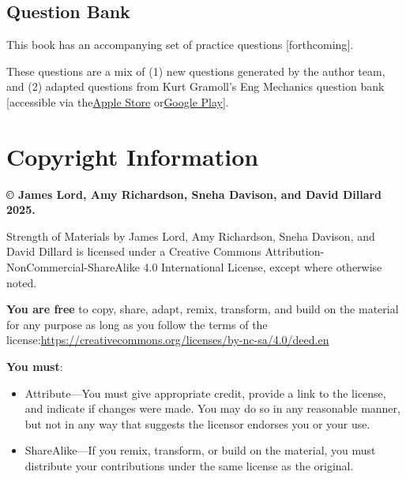 \documentclass[
  letterpaper,
  DIV=11,
  numbers=noendperiod]{scrreprt}
\theoremstyle{definition}
\theoremstyle{remark}
\begin{document}
\subsection*{\texorpdfstring{\textbf{Question
Bank}}{Question Bank}}\label{question-bank}

This book has an accompanying set of practice questions
{[}forthcoming{]}.

These questions are a mix of (1) new questions generated by the author
team, and (2) adapted questions from Kurt Gramoll's Eng Mechanics
question bank {[}accessible via
the\href{https://apps.apple.com/us/app/eng-mechanics/id1526030024}{Apple
Store}
or\href{https://play.google.com/store/apps/details?id=air.com.gramago.engProbME&pli=1}{Google
Play}{]}.

\section*{\texorpdfstring{\textbf{Copyright
Information}}{Copyright Information}}\label{copyright-information}


\textbf{© James Lord, Amy Richardson, Sneha Davison, and David Dillard
2025.}

Strength of Materials by James Lord, Amy Richardson, Sneha Davison, and
David Dillard is licensed under a Creative Commons
Attribution-NonCommercial-ShareAlike 4.0 International License, except
where otherwise noted.

\textbf{You are free} to copy, share, adapt, remix, transform, and build
on the material for any purpose as long as you follow the terms of the
license:\href{https://creativecommons.org/licenses/by-sa/4.0/}{}\url{https://creativecommons.org/licenses/by-nc-sa/4.0/deed.en}

\textbf{You must}:

\begin{itemize}
\item
  Attribute---You must give appropriate credit, provide a link to the
  license, and indicate if changes were made. You may do so in any
  reasonable manner, but not in any way that suggests the licensor
  endorses you or your use.
\item
  ShareAlike---If you remix, transform, or build on the material, you
  must distribute your contributions under the same license as the
  original.
\end{itemize}
\end{document}
